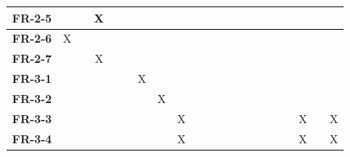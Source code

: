 \documentclass[12pt]{article}
\begin{document}
\begin{table}[H]
{\begin{tabular}{c|c|c|c|c|c|c|c|c|c|c|c|c|c|c|c|c|c|c|c|c|}
  \multicolumn{1}{|l|}{\textbf{FR-2-5}}  &              &              &       X      &              &              &              &              &              &              &              &              &              &              &              &              &              &              &              &              &              \\ \hline
  \multicolumn{1}{|l|}{\textbf{FR-2-6}}  &       X      &              &              &              &              &              &              &              &              &              &              &              &              &              &              &              &              &              &              &              \\ \hline
  \multicolumn{1}{|l|}{\textbf{FR-2-7}}  &              &              &       X      &              &              &              &              &              &              &              &              &              &              &              &              &              &              &              &              &              \\ \hline
  \multicolumn{1}{|l|}{\textbf{FR-3-1}}  &              &              &              &              &              &       X      &              &              &              &              &              &              &              &              &              &              &              &              &              &              \\ \hline
  \multicolumn{1}{|l|}{\textbf{FR-3-2}}  &              &              &              &              &              &              &       X      &              &              &              &              &              &              &              &              &              &              &              &              &              \\ \hline
  \multicolumn{1}{|l|}{\textbf{FR-3-3}}  &              &              &              &              &              &              &              &       X      &              &              &              &              &              &              &              &              &              &       X      &              &       X      \\ \hline
  \multicolumn{1}{|l|}{\textbf{FR-3-4}}  &              &              &              &              &              &              &              &       X      &              &              &              &              &              &              &              &              &              &       X      &              &       X      \\ \hline

\end{tabular}}
\end{table}
\end{document}
